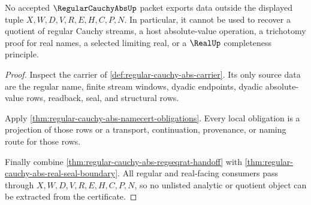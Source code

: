 \begin{theorem}
\label{thm:regular-cauchy-abs-non-escape}
No accepted $\RegularCauchyAbsUp$ packet exports data outside the displayed tuple $X,W,D,V,R,E,H,C,P,N$. In particular, it cannot be used to recover a quotient of regular Cauchy streams, a host absolute-value operation, a trichotomy proof for real names, a selected limiting real, or a $\RealUp$ completeness principle.
\end{theorem}
\begin{proof}
Inspect the carrier of \autoref{def:regular-cauchy-abs-carrier}. Its only source data are the regular name, finite stream windows, dyadic endpoints, dyadic absolute-value rows, readback, seal, and structural rows.

Apply \autoref{thm:regular-cauchy-abs-namecert-obligations}. Every local obligation is a projection of those rows or a transport, continuation, provenance, or naming route for those rows.

Finally combine \autoref{thm:regular-cauchy-abs-regseqrat-handoff} with \autoref{thm:regular-cauchy-abs-real-seal-boundary}. All regular and real-facing consumers pass through $X,W,D,V,R,E,H,C,P,N$, so no unlisted analytic or quotient object can be extracted from the certificate.
\end{proof}

